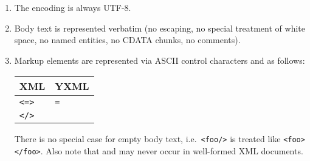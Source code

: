 \begin{isabellebody}
\begin{isamarkuptext}
  \begin{enumerate}

  \item The encoding is always UTF-8.

  \item Body text is represented verbatim (no escaping, no special
  treatment of white space, no named entities, no CDATA chunks, no
  comments).

  \item Markup elements are represented via ASCII control characters
   and  as follows:

  \begin{tabular}{ll}
    XML & YXML \\\hline
    \verb|<|\isa{{\isaliteral{22}{\isachardoublequote}}name\ attribute{\isaliteral{22}{\isachardoublequote}}}\verb|=|\isa{{\isaliteral{22}{\isachardoublequote}}value\ {\isaliteral{5C3C646F74733E}{\isasymdots}}{\isaliteral{22}{\isachardoublequote}}}\verb|>| &
    \isa{{\isaliteral{22}{\isachardoublequote}}\isaliteral{5C3C5E626F6C643E}{}\isactrlbold X\isaliteral{5C3C5E626F6C643E}{}\isactrlbold Yname\isaliteral{5C3C5E626F6C643E}{}\isactrlbold Yattribute{\isaliteral{22}{\isachardoublequote}}}\verb|=|\isa{{\isaliteral{22}{\isachardoublequote}}value{\isaliteral{5C3C646F74733E}{\isasymdots}}\isaliteral{5C3C5E626F6C643E}{}\isactrlbold X{\isaliteral{22}{\isachardoublequote}}} \\
    \verb|</|\isa{name}\verb|>| & \isa{{\isaliteral{22}{\isachardoublequote}}\isaliteral{5C3C5E626F6C643E}{}\isactrlbold X\isaliteral{5C3C5E626F6C643E}{}\isactrlbold Y\isaliteral{5C3C5E626F6C643E}{}\isactrlbold X{\isaliteral{22}{\isachardoublequote}}} \\
  \end{tabular}

  There is no special case for empty body text, i.e.\ \verb|<foo/>| is treated like \verb|<foo></foo>|.  Also note that
   and  may never occur in
  well-formed XML documents.


\end{enumerate}
\end{isamarkuptext}
\end{isabellebody}
